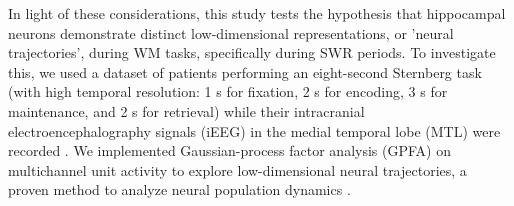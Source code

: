 \indent
In light of these considerations, this study tests the hypothesis that hippocampal neurons demonstrate distinct low-dimensional representations, or 'neural trajectories', during WM tasks, specifically during SWR periods. To investigate this, we used a dataset of patients performing an eight-second Sternberg task (with high temporal resolution: 1 s for fixation, 2 s for encoding, 3 s for maintenance, and 2 s for retrieval) while their intracranial electroencephalography signals (iEEG) in the medial temporal lobe (MTL) were recorded \cite{boran_dataset_2020}. We implemented Gaussian-process factor analysis (GPFA) on multichannel unit activity to explore low-dimensional neural trajectories, a proven method to analyze neural population dynamics \cite{yu_gaussian-process_2009}.
\label{sec:introduction}